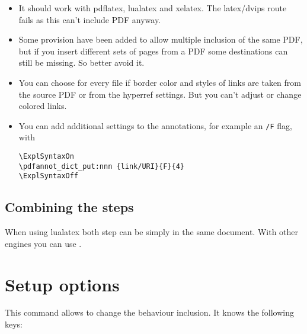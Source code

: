 \documentclass[DIV=12,parskip=half-,bibliography=totoc]{scrartcl}
\begin{document}
\begin{itemize}
\item It should work with pdflatex, lualatex and xelatex. The latex/dvips route fails as this can't include PDF anyway.
\item Some provision have been added to allow multiple inclusion of the same PDF, but if you insert different sets of pages from a PDF some destinations can still be missing. So better avoid it.
\item You can choose for every file if border color and styles of links are taken from the source PDF or from the hyperref settings. But you can't adjust or change colored links.
\item You can add additional settings to the annotations, for example an \texttt{/F} flag, with

\begin{lstlisting}
\ExplSyntaxOn
\pdfannot_dict_put:nnn {link/URI}{F}{4}
\ExplSyntaxOff
\end{lstlisting}

\end{itemize}



\subsection{Combining the steps}

When using lualatex both step can be simply in the same document.
With other engines you can use .



\section{Setup options}

\DescribeMacro{}

This command allows to change the behaviour inclusion. It knows the following keys:
\end{document}
